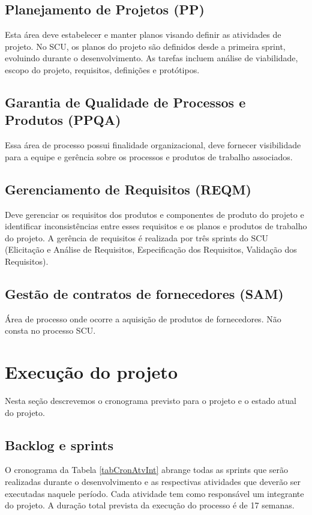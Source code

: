 \documentclass[	DIV=calc,%
							paper=a4,%
							fontsize=12pt,%
							onecolumn]{scrartcl}%
\begin{document}
\subsection{Planejamento de Projetos (PP)} 
Esta área deve estabelecer e manter planos visando definir as atividades de projeto. No SCU, os planos do projeto são definidos desde a primeira sprint, evoluindo durante o desenvolvimento. As tarefas incluem análise de viabilidade, escopo do projeto, requisitos, definições e protótipos. 

\subsection{Garantia de Qualidade de Processos e Produtos (PPQA)} 
Essa área de processo possui finalidade organizacional, deve fornecer visibilidade para a equipe e gerência sobre os processos e produtos de trabalho associados.

\subsection{Gerenciamento de Requisitos (REQM)} 
Deve gerenciar os requisitos dos produtos e componentes de produto do projeto e identificar inconsistências entre esses requisitos e os planos e produtos de trabalho do projeto. A gerência de requisitos é realizada por três sprints do SCU (Elicitação e Análise de Requisitos, Especificação dos Requisitos, Validação dos Requisitos).

\subsection{Gestão de contratos de fornecedores (SAM)}
Área de processo onde ocorre a aquisição de produtos de fornecedores. Não consta no processo SCU.


\section{Execução do projeto}

Nesta seção descrevemos o cronograma previsto para o projeto e o estado atual do projeto.

\subsection{Backlog e sprints}
O cronograma da Tabela \ref{tabCronAtvInt} abrange todas as sprints que serão realizadas durante o desenvolvimento e as respectivas atividades que deverão ser executadas naquele período. Cada atividade tem como responsável um integrante do projeto. A duração total prevista da execução do processo é de 17 semanas.
\end{document}
